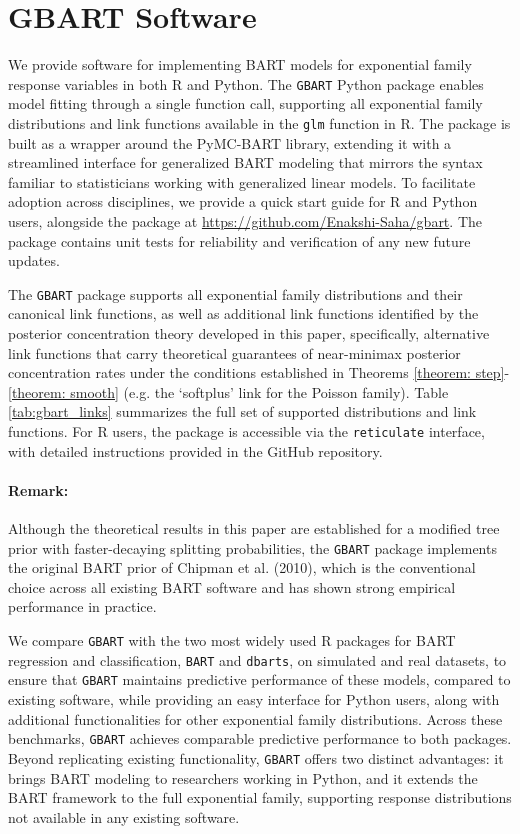\documentclass[12pt]{article}
\newcommand{\1}{\mathbb{I}}
\theoremstyle{plain}
\theoremstyle{definition}
\theoremstyle{remark}
\begin{document}
\section{GBART Software}\label{sec:software}
We provide software for implementing BART models for exponential family response variables in both R and Python. The \texttt{GBART} Python package enables model fitting through a single function call, supporting all exponential family distributions and link functions available in the \texttt{glm} function in R. The package is built as a wrapper around the PyMC-BART library, extending it with a streamlined interface for generalized BART modeling that mirrors the syntax familiar to statisticians working with generalized linear models. To facilitate adoption across disciplines, we provide a quick start guide for R and Python users, alongside the package at \url{https://github.com/Enakshi-Saha/gbart}. The package contains unit tests for reliability and verification of any new future updates.

The \texttt{GBART} package supports all exponential family distributions and their canonical link functions, as well as additional link functions identified by the posterior concentration theory developed in this paper, specifically, alternative link functions that carry theoretical guarantees of near-minimax posterior concentration rates under the conditions established in Theorems \ref{theorem: step}-\ref{theorem: smooth} (e.g. the `softplus' link for the Poisson family). Table \ref{tab:gbart_links} summarizes the full set of supported distributions and link functions. For R users, the package is accessible via the \texttt{reticulate} interface, with detailed instructions provided in the GitHub repository.

\paragraph{Remark:} Although the theoretical results in this paper are established for a modified tree prior with faster-decaying splitting probabilities, the \texttt{GBART} package implements the original BART prior of Chipman et al. (2010), which is the conventional choice across all existing BART software and has shown strong empirical performance in practice.

We compare \texttt{GBART} with the two most widely used R packages for BART regression and classification, \texttt{BART} and \texttt{dbarts}, on simulated and real datasets, to ensure that \texttt{GBART} maintains predictive performance of these models, compared to existing software, while providing an easy interface for Python users, along with additional functionalities for other exponential family distributions. Across these benchmarks, \texttt{GBART} achieves comparable predictive performance to both packages. Beyond replicating existing functionality, \texttt{GBART} offers two distinct advantages: it brings BART modeling to researchers working in Python, and it extends the BART framework to the full exponential family, supporting response distributions not available in any existing software.
\end{document}
